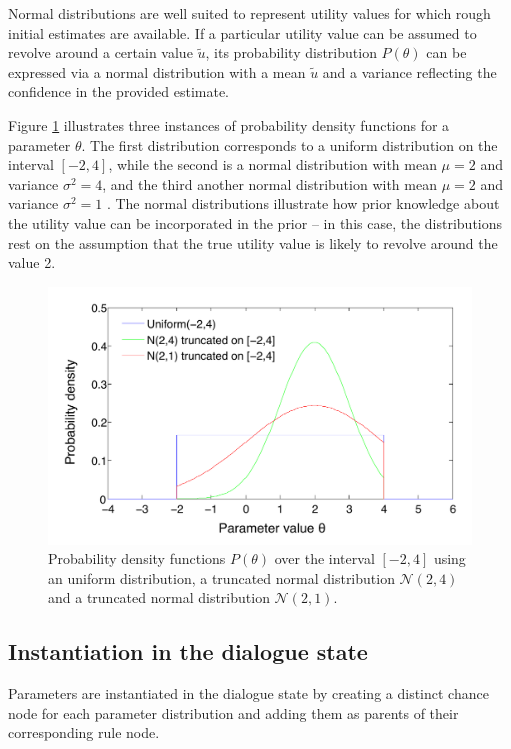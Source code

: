 Normal distributions are well suited to represent utility values for which rough initial estimates are available. If a particular utility value can be assumed to revolve around a certain value $\tilde{u}$, its probability distribution $P(\theta)$ can be expressed via a normal distribution with a mean $\tilde{u}$ and a variance reflecting the confidence in the provided estimate. 

Figure \ref{fig:uniformn} illustrates three instances of probability density functions for a parameter $\theta$.  The first distribution corresponds to a uniform distribution on the interval $[-2,4]$, while the second is a normal distribution with mean $\mu=2$ and variance $\sigma^2=4$, and the third another normal distribution  with mean $\mu=2$ and variance $\sigma^2=1$ .  The normal distributions illustrate how prior knowledge about the utility value can be incorporated in the prior -- in this case, the distributions rest on the assumption that the true utility value is likely to revolve around the value 2. 

\begin{figure}[h]
\centering
\includegraphics[scale=0.4]{imgs/uniformn.pdf}
\caption{Probability density functions $P(\theta)$ over the interval $[-2,4]$ using an uniform distribution, a truncated normal distribution $\mathcal{N}(2,4)$ and a truncated normal distribution $\mathcal{N}(2,1)$.} 
\label{fig:uniformn}
\end{figure}

\subsection{Instantiation in the dialogue state}
\label{sec:rule-params-instantiation}

Parameters are instantiated in the dialogue state by creating a distinct chance node for each parameter distribution and adding them as parents of their corresponding rule node.  

